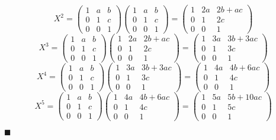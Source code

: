 \documentclass[12pt]{article}
\renewcommand{\qed}{\hfill$\blacksquare$}
\renewenvironment{proof}{\begin{addmargin}[1em]{0em}\begin{newproof}}{\end{newproof}\end{addmargin}\qed}
\begin{document}
\begin{proof}
\begin{itemize}
    $$ X^2 = \left(\begin{array}{ccc} 1 & a & b \\ 0 & 1 & c \\ 0 & 0 & 1 \end{array}\right)\left(\begin{array}{ccc} 1 & a & b \\ 0 & 1 & c \\ 0 & 0 & 1 \end{array}\right) = \left( \begin{array}{ccc} 1 & 2a & 2b + ac \\ 0 & 1 & 2c \\ 0 & 0  & 1 \end{array}\right) $$
    $$ X^3 = \left(\begin{array}{ccc} 1 & a & b \\ 0 & 1 & c \\ 0 & 0 & 1 \end{array}\right)\left( \begin{array}{ccc} 1 & 2a & 2b + ac \\ 0 & 1 & 2c \\ 0 & 0  & 1 \end{array}\right) = \left( \begin{array}{ccc} 1 & 3a & 3b+3ac \\ 0 & 1 & 3c  \\ 0 & 0  & 1 \end{array}\right) $$
    $$ X^4 = \left(\begin{array}{ccc} 1 & a & b \\ 0 & 1 & c \\ 0 & 0 & 1 \end{array}\right)\left( \begin{array}{ccc} 1 & 3a & 3b+3ac \\ 0 & 1 & 3c  \\ 0 & 0  & 1 \end{array}\right) = \left( \begin{array}{ccc} 1 & 4a & 4b+6ac \\ 0 & 1 & 4c  \\ 0 & 0  & 1 \end{array}\right) $$
    $$ X^5 = \left(\begin{array}{ccc} 1 & a & b \\ 0 & 1 & c \\ 0 & 0 & 1 \end{array}\right)\left( \begin{array}{ccc} 1 & 4a & 4b+6ac \\ 0 & 1 & 4c  \\ 0 & 0  & 1 \end{array}\right) = \left( \begin{array}{ccc} 1 & 5a & 5b+10ac \\ 0 & 1 & 5c  \\ 0 & 0  & 1 \end{array}\right) $$

\end{itemize}
\end{proof}
\end{document}
